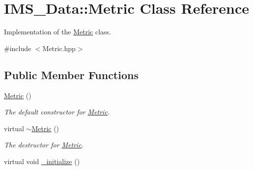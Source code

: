 \hypertarget{classIMS__Data_1_1Metric}{
\section{IMS\_\-Data::Metric Class Reference}
\label{classIMS__Data_1_1Metric}
}


Implementation of the \hyperlink{classIMS__Data_1_1Metric}{Metric} class.  




{\ttfamily \#include $<$Metric.hpp$>$}

\subsection*{Public Member Functions}
\begin{DoxyCompactItemize}
\item 
\hypertarget{classIMS__Data_1_1Metric_afc881828b967d45a63c48e3cf64302ed}{
\hyperlink{classIMS__Data_1_1Metric_afc881828b967d45a63c48e3cf64302ed}{Metric} ()}
\label{classIMS__Data_1_1Metric_afc881828b967d45a63c48e3cf64302ed}

\begin{DoxyCompactList}\small\item\em The default constructor for \hyperlink{classIMS__Data_1_1Metric}{Metric}. \item\end{DoxyCompactList}\item 
\hypertarget{classIMS__Data_1_1Metric_a7c74a50e28582efffabc90e0cbfc2c6a}{
virtual \hyperlink{classIMS__Data_1_1Metric_a7c74a50e28582efffabc90e0cbfc2c6a}{$\sim$Metric} ()}
\label{classIMS__Data_1_1Metric_a7c74a50e28582efffabc90e0cbfc2c6a}

\begin{DoxyCompactList}\small\item\em The destructor for \hyperlink{classIMS__Data_1_1Metric}{Metric}. \item\end{DoxyCompactList}\item 
\hypertarget{classIMS__Data_1_1Metric_ac7007a9f4fd944fff749fb7ae2d57884}{
virtual void \hyperlink{classIMS__Data_1_1Metric_ac7007a9f4fd944fff749fb7ae2d57884}{\_\-initialize} ()}
\label{classIMS__Data_1_1Metric_ac7007a9f4fd944fff749fb7ae2d57884}


\end{DoxyCompactItemize}

